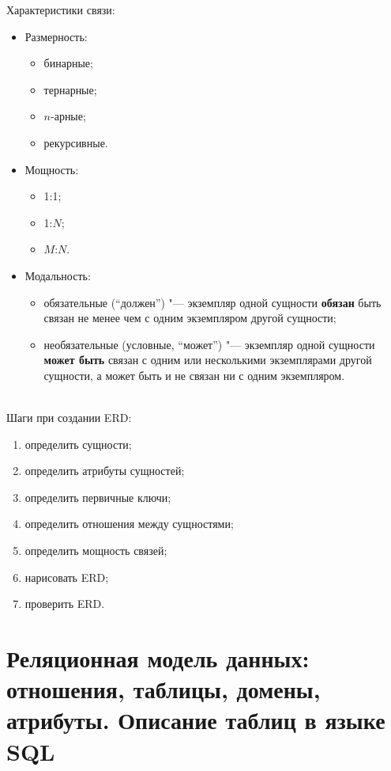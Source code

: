Характеристики связи:
\begin{itemize}
	\item Размерность:
		\begin{itemize}
			\item бинарные;
			\item тернарные;
			\item $ n $-арные;
			\item рекурсивные.
		\end{itemize}
	\item Мощность:
		\begin{itemize}
			\item 1:1;
			\item 1:$ N $;
			\item $ M $:$ N $.
		\end{itemize}
	\item Модальность:
		\begin{itemize}
			\item обязательные (``должен'') "--- экземпляр одной сущности \textbf{обязан} быть связан не менее чем с одним экземпляром другой сущности;
			\item необязательные (условные, ``может'') "--- экземпляр одной сущности \textbf{может быть} связан с одним или несколькими экземплярами другой сущности, а может быть и не связан ни с одним экземпляром.
		\end{itemize}
\end{itemize}

 \\
Шаги при создании ERD:
\begin{enumerate}
	\item определить сущности;
	\item определить атрибуты сущностей;
	\item определить первичные ключи;
	\item определить отношения между сущностями;
	\item определить мощность связей;
	\item нарисовать ERD;
	\item проверить ERD.
\end{enumerate}

\section{Реляционная модель данных: отношения, таблицы, домены, атрибуты. Описание таблиц в языке SQL}

